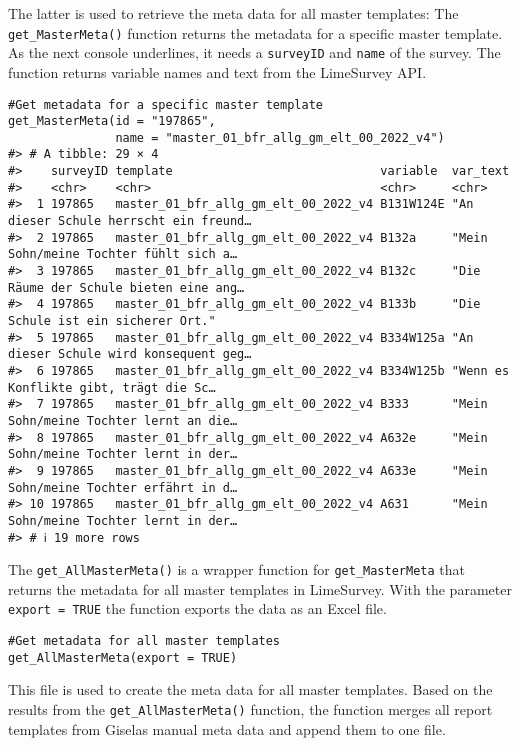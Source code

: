 The latter is used to retrieve the meta data for all master templates:
The \texttt{get\_MasterMeta()} function returns the metadata for a
specific master template. As the next console underlines, it needs a
\texttt{surveyID} and \texttt{name} of the survey. The function returns
variable names and text from the LimeSurvey API.

\begin{verbatim}
#Get metadata for a specific master template
get_MasterMeta(id = "197865",
               name = "master_01_bfr_allg_gm_elt_00_2022_v4")
#> # A tibble: 29 × 4
#>    surveyID template                             variable  var_text                              
#>    <chr>    <chr>                                <chr>     <chr>                                 
#>  1 197865   master_01_bfr_allg_gm_elt_00_2022_v4 B131W124E "An dieser Schule herrscht ein freund…
#>  2 197865   master_01_bfr_allg_gm_elt_00_2022_v4 B132a     "Mein Sohn/meine Tochter fühlt sich a…
#>  3 197865   master_01_bfr_allg_gm_elt_00_2022_v4 B132c     "Die Räume der Schule bieten eine ang…
#>  4 197865   master_01_bfr_allg_gm_elt_00_2022_v4 B133b     "Die Schule ist ein sicherer Ort."    
#>  5 197865   master_01_bfr_allg_gm_elt_00_2022_v4 B334W125a "An dieser Schule wird konsequent geg…
#>  6 197865   master_01_bfr_allg_gm_elt_00_2022_v4 B334W125b "Wenn es Konflikte gibt, trägt die Sc…
#>  7 197865   master_01_bfr_allg_gm_elt_00_2022_v4 B333      "Mein Sohn/meine Tochter lernt an die…
#>  8 197865   master_01_bfr_allg_gm_elt_00_2022_v4 A632e     "Mein Sohn/meine Tochter lernt in der…
#>  9 197865   master_01_bfr_allg_gm_elt_00_2022_v4 A633e     "Mein Sohn/meine Tochter erfährt in d…
#> 10 197865   master_01_bfr_allg_gm_elt_00_2022_v4 A631      "Mein Sohn/meine Tochter lernt in der…
#> # ℹ 19 more rows
\end{verbatim}

The \texttt{get\_AllMasterMeta()} is a wrapper function for
\texttt{get\_MasterMeta} that returns the metadata for all master
templates in LimeSurvey. With the parameter \texttt{export\ =\ TRUE} the
function exports the data as an Excel file.

\begin{verbatim}
#Get metadata for all master templates
get_AllMasterMeta(export = TRUE)
\end{verbatim}

This file is used to create the meta data for all master templates.
Based on the results from the \texttt{get\_AllMasterMeta()} function,
the function merges all report templates from Giselas manual meta data
and append them to one file.

